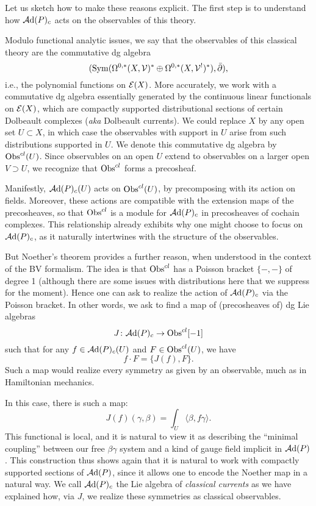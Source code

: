 \subsubsection{}

Let us sketch how to make these reasons explicit.
The first step is to understand how $\mathcal A{\rm d}(P)_c$ acts on the observables of this theory.

Modulo functional analytic issues,
we say that the observables of this classical theory are the commutative dg algebra
\[
({\rm Sym}(\Omega^{0,*}(X,\mathcal V)^* \oplus \Omega^{0,*}(X, \mathcal V^!)^*), \Bar{\partial}),
\]
i.e., the polynomial functions on $\mathcal E(X)$.
More accurately, we work with a commutative dg algebra essentially generated by the continuous linear functionals on $\mathcal E(X)$, 
which are compactly supported distributional sections of certain Dolbeault complexes ({\it aka} Dolbeault currents).
We could replace $X$ by any open set $U \subset X$, 
in which case the observables with support in $U$ arise from such distributions supported in $U$.
We denote this commutative dg algebra by ${\rm Obs}^{cl}(U)$.
Since observables on an open $U$ extend to observables on a larger open $V \supset U$,
we recognize that ${\rm Obs}^{cl}$ forms a precosheaf.

Manifestly, $\mathcal A{\rm d}(P)_c(U)$ acts on ${\rm Obs}^{cl}(U)$,
by precomposing with its action on fields.
Moreover, these actions are compatible with the extension maps of the precosheaves,
so that ${\rm Obs}^{cl}$ is a module for $\mathcal A{\rm d}(P)_c$ in precosheaves of cochain complexes.
This relationship already exhibits why one might choose to focus on $\mathcal A{\rm d}(P)_c$,
as it naturally intertwines with the structure of the observables.

But Noether's theorem provides a further reason,
when understood in the context of the BV formalism.
The idea is that ${\rm Obs}^{cl}$ has a Poisson bracket $\{-,-\}$ of degree 1
(although there are some issues with distributions here that we suppress for the moment).
Hence one can ask to realize the action of $\mathcal A{\rm d}(P)_c$ via the Poisson bracket.
In other words, we ask to find a map of (precosheaves of) dg Lie algebras
\[
J \colon \mathcal A{\rm d}(P)_c \to {\rm Obs}^{cl}[-1]
\]
such that for any $f \in \mathcal A{\rm d}(P)_c(U)$ and $F \in {\rm Obs}^{cl}(U)$,
we have
\[
f \cdot F = \{J(f),F\}.
\]
Such a map would realize every symmetry as given by an observable,
much as in Hamiltonian mechanics.

In this case, there is such a map:
\[
J(f)(\gamma,\beta) = \int_U \langle\beta, f \gamma\rangle.
\]
This functional is local, and it is natural to view it as describing the ``minimal coupling'' between our free $\beta\gamma$ system and a kind of gauge field implicit in $\mathcal A{\rm d}(P)$.
This construction thus shows again that it is natural to work with compactly supported sections of $\mathcal A{\rm d}(P)$,
since it allows one to encode the Noether map in a natural way.
We call $\mathcal A{\rm d}(P)_c$ the Lie algebra of {\em classical currents} as we have explained how, via $J$, we realize these symmetries as classical observables.


